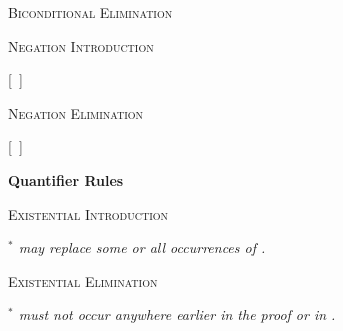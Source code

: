 \textsc{Biconditional Elimination}

\begin{ndproof}
	 
\end{ndproof}

\begin{ndproof}
	 
\end{ndproof}



\textsc{Negation Introduction}

\begin{ndproof}
\open
	\metaA{}
	\metaB{}
\close
{}[\ ]{\enot\metaA{}}
\end{ndproof}

\textsc{Negation Elimination}

\begin{ndproof}
\open
	\metaB{}
\close
{}[\ ]\metaA{}
\end{ndproof}






\newpage

{\large \bf Quantifier Rules}

\textsc{Existential Introduction}

\begin{ndproof}
	 
\end{ndproof}

\begin{footnotesize}\emph{
$^\ast$  may replace some or all occurrences of .}
\end{footnotesize}


\textsc{Existential Elimination}

\begin{ndproof}
	\open	
		 
	\close
	 
\end{ndproof}

\begin{footnotesize}\emph{
$^\ast$  must not occur anywhere earlier in the proof or in \metaB{}.}
\end{footnotesize}


